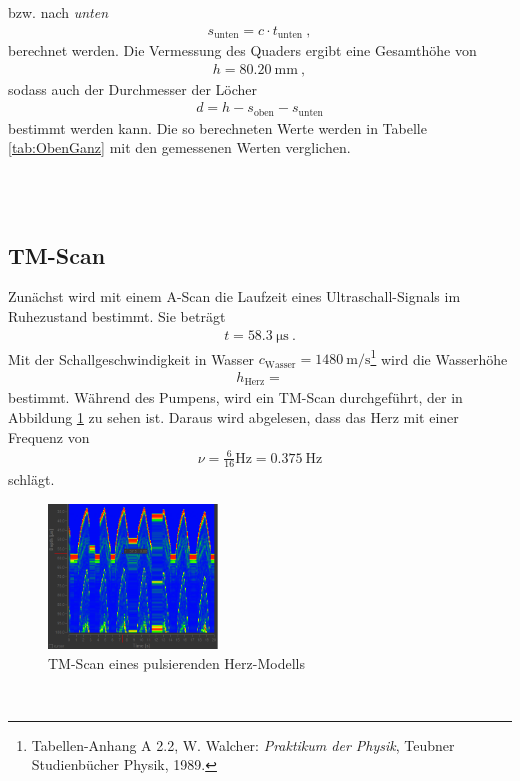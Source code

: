 bzw. nach \emph{unten}
\begin{align}
	s_\text{unten} = c \cdot t_\text{unten} \ ,
\end{align}
berechnet werden. Die Vermessung des Quaders ergibt eine Gesamthöhe von
\begin{align}
	h = \SI{80.20}{\milli\meter} \ ,
\end{align}
sodass auch der Durchmesser der Löcher
\begin{align}
	d = h - s_\text{oben} - s_\text{unten}
\end{align}
bestimmt werden kann. Die so berechneten Werte werden in Tabelle \ref{tab:ObenGanz} mit den gemessenen Werten verglichen.

\ \\
\ \\


\subsection{TM-Scan}
Zunächst wird mit einem A-Scan die Laufzeit eines Ultraschall-Signals im Ruhezustand bestimmt. Sie beträgt
\begin{align}
	t = \SI{58.3}{\micro\second} \ .
\end{align}
Mit der Schallgeschwindigkeit in Wasser $c_\text{Wasser} = \SI{1480}{\meter\per\second}$\footnote{Tabellen-Anhang A 2.2, W. Walcher: \emph{Praktikum der Physik}, Teubner Studienbücher Physik, 1989.} wird die Wasserhöhe
\begin{align}
	h_\text{Herz} = 
\end{align}
bestimmt. Während des Pumpens, wird ein TM-Scan durchgeführt, der in Abbildung \ref{fig:Herz} zu sehen ist. Daraus wird abgelesen, dass das Herz mit einer Frequenz von
\begin{align}
	\nu = \frac{6}{16}\si{\hertz} = \SI{0.375}{\hertz}
\end{align}
\grqq schlägt\grqq.
\begin{figure}[h!]
	\centering
	\includegraphics[width=0.4\textwidth]{TimeScan.png}
	\caption{TM-Scan eines pulsierenden Herz-Modells}
	\label{fig:Herz}
\end{figure} \\

